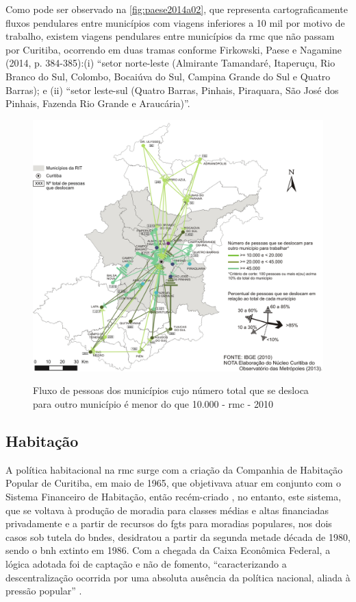 	Como pode ser observado na \autoref{fig:paese2014a02}, que representa cartograficamente fluxos pendulares entre municípios com viagens inferiores a 10 mil por motivo de trabalho, existem viagens pendulares entre municípios da \gls{rmc} que não passam por Curitiba, ocorrendo em duas tramas conforme Firkowski, Paese e Nagamine (2014, p. 384-385):(i) “setor norte-leste (Almirante Tamandaré, Itaperuçu, Rio Branco do Sul, Colombo, Bocaiúva do Sul, Campina Grande do Sul e Quatro Barras); e (ii) ``setor leste-sul (Quatro Barras, Pinhais, Piraquara, São José dos Pinhais, Fazenda Rio Grande e Araucária)''.

	\begin{figure}
		\centering
		\caption{Fluxo de pessoas dos municípios cujo número total que se desloca para outro município é menor do que 10.000 - \gls{rmc} - 2010}
		\includegraphics[width=0.7\linewidth]{img/paese2014a_02}
		\label{fig:paese2014a02}
	\end{figure}
	
	\subsection{Habitação}
	
	A política habitacional na \glsdesc{rmc} surge com a criação da Companhia de Habitação Popular de Curitiba, em maio de 1965, que objetivava atuar em conjunto com o Sistema Financeiro de Habitação, então recém-criado \cite[p. 81]{colin2009a}, no entanto, este sistema, que se voltava à produção de moradia para classes médias e altas financiadas privadamente e a partir de recursos do \gls{fgts} para moradias populares, nos dois casos sob tutela do \gls{bndes}, desidratou a partir da segunda metade década de 1980, sendo o \gls{bnh} extinto em 1986. Com a chegada da Caixa Econômica Federal, a lógica adotada foi de captação e não de fomento, ``caracterizando a descentralização ocorrida por
	uma absoluta ausência da política nacional, aliada à pressão popular'' \cite[p. 82]{colin2009a}.
	
